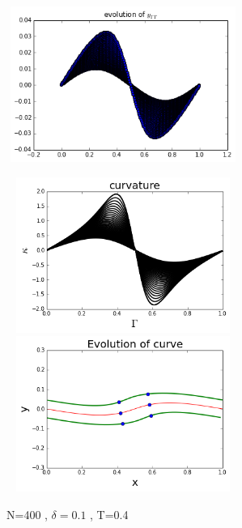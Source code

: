 \documentclass[12pt,twoside]{article}
\begin{document}
\begin{figure}[ht]
\begin{minipage}[b]{0.45\linewidth}
\includegraphics[width=3in,height=2in]{yppT04.png}

\includegraphics[width=3in,height=2in]{curvatureT04.png}
\includegraphics[width=3in,height=2in]{curveT04.png}
\caption{N=400 , $\delta=0.1$ , T=0.4}
\end{minipage}
\end{figure}
\end{document}
